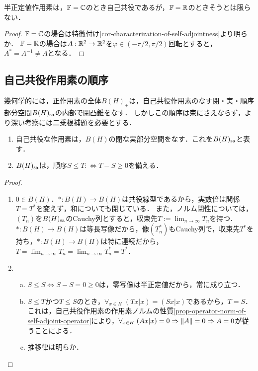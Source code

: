 \documentclass[uplatex,dvipdfmx]{jsreport}
\begin{document}
\begin{lemma}[半正定値作用素の自己共役性]
    半正定値作用素は，$\mathbb{F}=\mathbb{C}$のとき自己共役であるが，$\mathbb{F}=\mathbb{R}$のときそうとは限らない．
\end{lemma}
\begin{proof}
    $\mathbb{F}=\mathbb{C}$の場合は特徴付け\ref{cor-characterization-of-self-adjointness}より明らか．
    $\mathbb{F}=\mathbb{R}$の場合は$A:\mathbb{R}^2\to\mathbb{R}^2$を$\varphi\in(-\pi/2,\pi/2)$回転とすると，$A^*=A^{-1}\ne A$となる．
\end{proof}

\subsection{自己共役作用素の順序}

\begin{tcolorbox}[colframe=ForestGreen, colback=ForestGreen!10!white,breakable,colbacktitle=ForestGreen!40!white,coltitle=black,fonttitle=\bfseries\sffamily,
title=]
    幾何学的には，正作用素の全体$B(H)_+$は，自己共役作用素のなす閉・実・順序部分空間$B(H)_{\mathrm{sa}}$の内部で閉凸錐をなす．
    しかしこの順序は束にさえならず，より深い考察には二乗根補題を必要とする．
\end{tcolorbox}

\begin{proposition}\mbox{}
    \begin{enumerate}
        \item 自己共役な作用素は，$B(H)$の閉な実部分空間をなす．これを$B(H)_{\mathrm{sa}}$と表す．
        \item $B(H)_{\mathrm{sa}}$は，順序$S\le T:\Leftrightarrow T-S\ge 0$を備える．
    \end{enumerate}
\end{proposition}
\begin{proof}\mbox{}
    \begin{enumerate}
        \item $0\in B(H)$．$*:B(H)\to B(H)$は共役線型であるから，実数倍は関係$T=T^*$を変えず，和についても閉じている．
        また，ノルム閉性については，$(T_n)$を$B(H)_{\mathrm{sa}}$のCauchy列とすると，収束先$T:=\lim_{n\to\infty}T_n$を持つ．$*:B(H)\to B(H)$は等長写像だから，像$(T_n^*)$もCauchy列で，収束先$T^*$を持ち，$*:B(H)\to B(H)$は特に連続だから，$T=\lim_{n\to\infty}T_n=\lim_{n\to\infty}T_n^*=T^*$．
        \item \begin{enumerate}[(a)]
            \item $S\le S\Leftrightarrow S-S=0\ge 0$は，零写像は半正定値だから，常に成り立つ．
            \item $S\le T$かつ$T\le S$のとき，$\forall_{x\in H}\;(Tx|x)=(Sx|x)$であるから，$T=S$．これは，自己共役作用素の作用素ノルムの性質\ref{prop-operator-norm-of-self-adjoint-operator}により，$\forall_{x\in H}\;(Ax|x)=0\Rightarrow\|A\|=0\Rightarrow A=0$が従うことによる．
            \item 推移律は明らか．
        \end{enumerate}
    \end{enumerate}
\end{proof}
\end{document}
